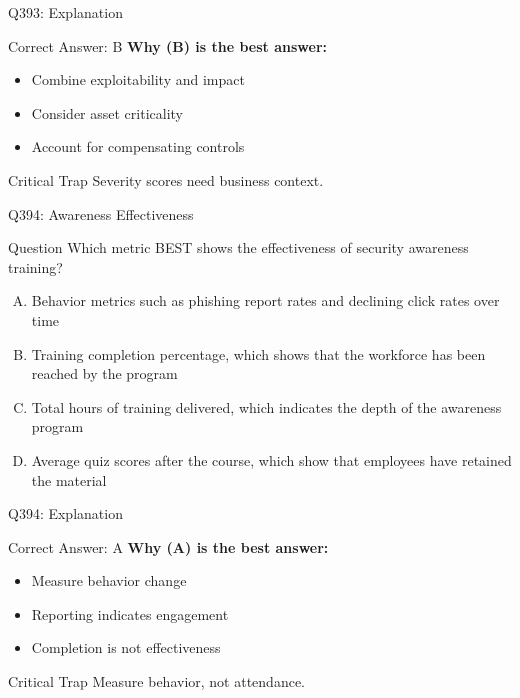 \documentclass{beamer}
\begin{document}
	\begin{frame}{Q393: Explanation}
		\begin{block}{Correct Answer: B}
			\textbf{Why (B) is the best answer:}
			\begin{itemize}
				\item Combine exploitability and impact
				\item Consider asset criticality
				\item Account for compensating controls
			\end{itemize}
		\end{block}
		\begin{alertblock}{Critical Trap}
			Severity scores need business context.
		\end{alertblock}
	\end{frame}
	
	\begin{frame}{Q394: Awareness Effectiveness}
		\begin{block}{Question}
			\small Which metric BEST shows the effectiveness of security awareness training?
		\end{block}
		\begin{enumerate}[(A)]
			\footnotesize
			\item Behavior metrics such as phishing report rates and declining click rates over time
			\item Training completion percentage, which shows that the workforce has been reached by the program
			\item Total hours of training delivered, which indicates the depth of the awareness program
			\item Average quiz scores after the course, which show that employees have retained the material
		\end{enumerate}
	\end{frame}
	
	\begin{frame}{Q394: Explanation}
		\begin{block}{Correct Answer: A}
			\textbf{Why (A) is the best answer:}
			\begin{itemize}
				\item Measure behavior change
				\item Reporting indicates engagement
				\item Completion is not effectiveness
			\end{itemize}
		\end{block}
		\begin{alertblock}{Critical Trap}
			Measure behavior, not attendance.
		\end{alertblock}
	\end{frame}
	
\end{document}
